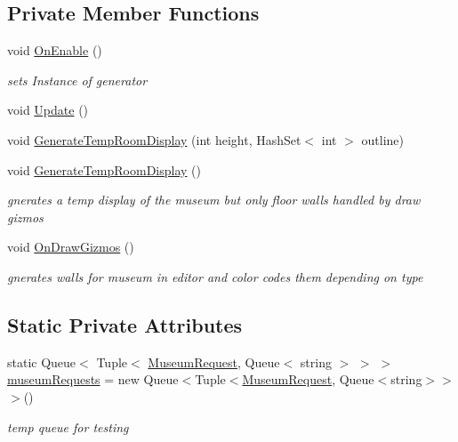 \subsection*{Private Member Functions}
\begin{DoxyCompactItemize}
\item 
void \mbox{\hyperlink{class_museum_generator_abc3127d3a23107a350064fc49c5495c1}{On\+Enable}} ()
\begin{DoxyCompactList}\small\item\em sets Instance of generator \end{DoxyCompactList}\item 
void \mbox{\hyperlink{class_museum_generator_afa0b7c3e8ab1bccedc4c7828cbf4724e}{Update}} ()
\item 
void \mbox{\hyperlink{class_museum_generator_a65ac409691646fa2f92ee9b84294ac57}{Generate\+Temp\+Room\+Display}} (int height, Hash\+Set$<$ int $>$ outline)
\item 
void \mbox{\hyperlink{class_museum_generator_a1b9419222535f317005ca9fe1fe757f3}{Generate\+Temp\+Room\+Display}} ()
\begin{DoxyCompactList}\small\item\em gnerates a temp display of the museum but only floor walls handled by draw gizmos \end{DoxyCompactList}\item 
void \mbox{\hyperlink{class_museum_generator_a7c219625d39af0857271734995728a10}{On\+Draw\+Gizmos}} ()
\begin{DoxyCompactList}\small\item\em gnerates walls for museum in editor and color codes them depending on type \end{DoxyCompactList}\end{DoxyCompactItemize}
\subsection*{Static Private Attributes}
\begin{DoxyCompactItemize}
\item 
static Queue$<$ Tuple$<$ \mbox{\hyperlink{class_museum_request}{Museum\+Request}}, Queue$<$ string $>$ $>$ $>$ \mbox{\hyperlink{class_museum_generator_a5295b75989f837f22b5d3de571061572}{museum\+Requests}} = new Queue$<$Tuple$<$\mbox{\hyperlink{class_museum_request}{Museum\+Request}}, Queue$<$string$>$$>$$>$()
\begin{DoxyCompactList}\small\item\em temp queue for testing \end{DoxyCompactList}\end{DoxyCompactItemize}


